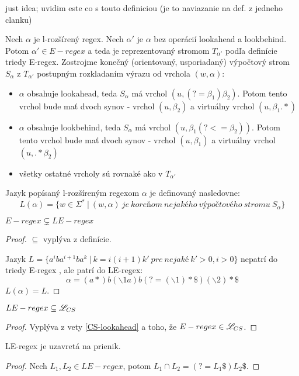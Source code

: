 \todo just idea; uvidim este co s touto definiciou (je to naviazanie na def. z jedneho clanku)
\begin{df}
Nech $\alpha$ je l-rozšírený regex. Nech $\alpha '$ je $\alpha$ bez operácií lookahead a lookbehind. Potom $\alpha ' \in E-regex$ a teda je reprezentovaný stromom $T_{\alpha '}$ podľa definície triedy E-regex. Zostrojme konečný (orientovaný, usporiadaný) výpočtový strom $S_\alpha$ z $T_{\alpha '}$ postupným rozkladaním výrazu od vrchola $(w,\alpha)$:
\begin{itemize}
  \item  $\alpha$ obsahuje lookahead, teda $S_\alpha$ má vrchol $(u, (?=\beta_1 )\beta_2)$. Potom tento vrchol bude mať dvoch synov - vrchol $(u,\beta_2)$ a virtuálny vrchol $(u,\beta_1 .*)$
  \item  $\alpha$ obsahuje lookbehind, teda $S_\alpha$ má vrchol $(u, \beta_1(?<=\beta_2))$. Potom tento vrchol bude mať dvoch synov - vrchol $(u,\beta_1)$ a virtuálny vrchol $(u,.*\beta_2)$
  \item všetky ostatné vrcholy sú rovnaké ako v $T_{\alpha '}$
\end{itemize}
Jazyk popísaný l-rozšíreným regexom $\alpha$ je definovaný nasledovne: 
$$L(\alpha ) = \lbrace w \in \Sigma ^* ~|~ (w, \alpha)~je~koreňom~nejakého~výpočtového~stromu~S_\alpha \rbrace$$
\end{df}

\begin{veta}
$ E-regex \subsetneq LE-regex $
\end{veta}
\begin{proof}
$ \subseteq $ vyplýva z definície.

Jazyk $L = \lbrace a^iba^{i+1}ba^k ~|~ k=i(i+1)k' ~ pre ~ nejaké ~ k'>0, i>0 \rbrace$ nepatrí do triedy E-regex \cite[Lemma 2]{ExtendedRegexIntersec}, ale patrí do LE-regex:
$$ \alpha = (a*)b(\backslash 1a)b(?=(\backslash 1)* \mathdollar )(\backslash 2)* \mathdollar $$ $ L(\alpha ) = L. $
\end{proof}

\begin{veta}
$ LE-regex \subseteq \mathscr{L}_{CS} $
\end{veta}
\begin{proof}
Vyplýva z vety \ref{CS-lookahead} a toho, že $ E-regex \in \mathscr{L}_{CS} $.
\end{proof}

\begin{veta}
LE-regex je uzavretá na prienik.
\end{veta}
\begin{proof}
Nech $L_1,L_2 \in LE-regex$, potom $L_1 \cap L_2 = \left( ?= L_1 \mathdollar \right) L_2 \mathdollar $.
\end{proof}

